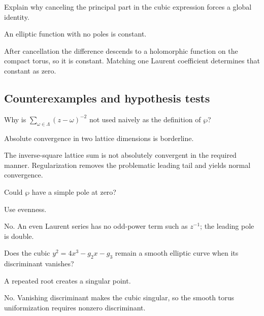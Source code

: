 \begin{exercise}\label{exr:iv29-expand-09}
Explain why canceling the principal part in the cubic expression forces a global identity.
\end{exercise}
\begin{hint}
An elliptic function with no poles is constant.
\end{hint}
\begin{solution}
After cancellation the difference descends to a holomorphic function on the compact torus, so it is constant. Matching one Laurent coefficient determines that constant as zero.
\end{solution}

\subsection*{Counterexamples and hypothesis tests}

\begin{exercise}\label{exr:iv29-expand-10}
Why is \(\sum_{\omega\in\Lambda}(z-\omega)^{-2}\) not used naively as the definition of \(\wp\)?
\end{exercise}
\begin{hint}
Absolute convergence in two lattice dimensions is borderline.
\end{hint}
\begin{solution}
The inverse-square lattice sum is not absolutely convergent in the required manner. Regularization removes the problematic leading tail and yields normal convergence.
\end{solution}

\begin{exercise}\label{exr:iv29-expand-11}
Could \(\wp\) have a simple pole at zero?
\end{exercise}
\begin{hint}
Use evenness.
\end{hint}
\begin{solution}
No. An even Laurent series has no odd-power term such as \(z^{-1}\); the leading pole is double.
\end{solution}

\begin{exercise}\label{exr:iv29-expand-12}
Does the cubic \(y^2=4x^3-g_2x-g_3\) remain a smooth elliptic curve when its discriminant vanishes?
\end{exercise}
\begin{hint}
A repeated root creates a singular point.
\end{hint}
\begin{solution}
No. Vanishing discriminant makes the cubic singular, so the smooth torus uniformization requires nonzero discriminant.
\end{solution}

